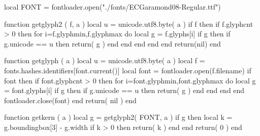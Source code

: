 \usepackage{graphicx}

\usepackage{geometry}


\usepackage{titling}

\usepackage{tipa}

\usepackage{soul}

\usepackage{multido}

\usepackage{fontspec}
\usepackage{microtype}

\usepackage{anyfontsize}

\usepackage{luacode}
\usepackage{luaotfload}

\begin{luacode}

local FONT = fontloader.open("./fonts/ECGaramond08-Regular.ttf")

function getglyph2 ( f, a )
 local u = unicode.utf8.byte( a )
 if f then
  if f.glyphcnt > 0 then
   for i=f.glyphmin,f.glyphmax do
    local g = f.glyphs[i]
    if g then
     if g.unicode == u then
      return( g )
     end
    end
   end
  end
 end
return(nil)
end

function getglyph ( a )
 local u = unicode.utf8.byte( a )
 local f = fonts.hashes.identifiers[font.current()]
 local font = fontloader.open(f.filename)
 if font then
  if font.glyphcnt > 0 then
   for i=font.glyphmin,font.glyphmax do
    local g = font.glyphs[i]
    if g then
     if g.unicode == u then
      return( g )
     end
    end
   end
  end
  fontloader.close(font)	
 end
return( nil )
end

function getkern ( a )
 local g = getglyph2( FONT, a )
 if g then
  local k = g.boundingbox[3] - g.width
   if k > 0 then
    return( k )
   end
 end
return( 0 )
end


\end{luacode}
